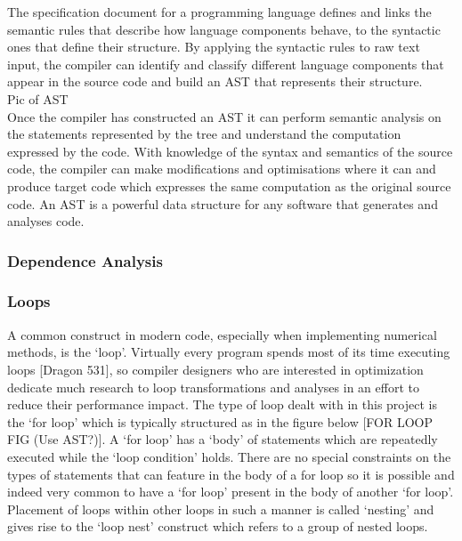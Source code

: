 \documentclass[a4paper,12pt,twoside]{report}
\begin{document}
The specification document for a programming language defines and links the semantic rules that describe 
how language components behave, to the syntactic ones that define their structure. 
By applying the syntactic rules to raw text input, the compiler can identify and classify different 
language components that appear in the source code and build an AST that represents their structure.
\\
Pic of AST
\\
Once the compiler has constructed an AST it can perform semantic analysis on the statements represented
by the tree and understand the computation expressed by the code. With knowledge of the syntax and 
semantics of the source code, the compiler can make modifications and optimisations where it can and produce 
target code which expresses the same computation as the original source code. An AST is a powerful
data structure for any software that generates and analyses code.

\subsubsection{Dependence Analysis}

\subsubsection{Loops}
A common construct in modern code, especially when implementing numerical methods, is the `loop'. Virtually every program spends most of its 
time executing loops [Dragon 531], so compiler designers who are interested in optimization dedicate much research to 
loop transformations and analyses in an effort to reduce their performance impact. The type of loop dealt with in this project is the
`for loop' which is typically structured as in the figure below [FOR LOOP FIG (Use AST?)]. A `for loop' has a `body' of statements which are repeatedly executed
while the `loop condition' holds. There are no special constraints on the types of statements that can feature in the body of a for loop so it
is possible and indeed very common to have a `for loop' present in the body of another `for loop'. Placement of loops within other loops in such a manner
is called `nesting' and gives rise to the `loop nest' construct which refers to a group of nested loops.
\end{document}
